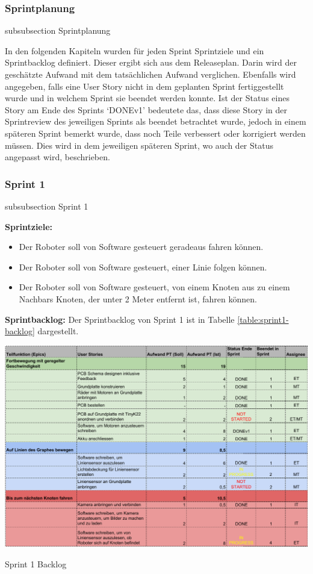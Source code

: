 \subsubsection*{Sprintplanung}
    {subsubsection}
    {Sprintplanung}

    
In den folgenden Kapiteln wurden für jeden Sprint Sprintziele und ein Sprintbacklog definiert. Dieser ergibt sich aus dem Releaseplan. Darin wird der geschätzte Aufwand mit dem tatsächlichen Aufwand verglichen. Ebenfalls wird angegeben, falls eine User Story nicht in dem geplanten Sprint fertiggestellt wurde und in welchem Sprint sie beendet werden konnte. Ist der Status eines Story am Ende des Sprints `DONEv1' bedeutete das, dass diese Story in der Sprintreview des jeweiligen Sprints als beendet betrachtet wurde, jedoch in einem späteren Sprint bemerkt wurde, dass noch Teile verbessert oder korrigiert werden müssen. Dies wird in dem jeweiligen späteren Sprint, wo auch der Status angepasst wird, beschrieben. 


\subsubsection*{Sprint 1}
    {subsubsection}
    {Sprint 1}

\textbf{Sprintziele:}
\begin{itemize}
    \item Der Roboter soll von Software gesteuert geradeaus fahren können.
    \item Der Roboter soll von Software gesteuert, einer Linie folgen können.
    \item Der Roboter soll von Software gesteuert, von einem Knoten aus zu einem Nachbars Knoten, der unter 2 Meter entfernt ist, fahren können.
\end{itemize}

\textbf{Sprintbacklog:} Der Sprintbacklog von Sprint 1 ist in Tabelle 
\ref{table:sprint1-backlog} 
dargestellt.

\begin{table}[H]
\centering
\includegraphics[width=\textwidth]{assets/projektmanagement/sprint1-crop.pdf}
\caption{Sprint 1 Backlog}
\label{table:sprint1-backlog}
\end{table}

